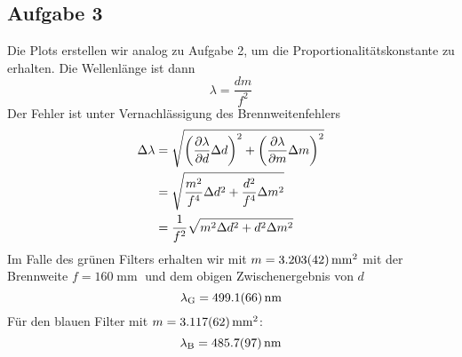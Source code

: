 \documentclass[a4paper,german,12pt,smallheadings]{scrartcl}
\begin{document}
\subsection{Aufgabe 3}
Die Plots erstellen wir analog zu Aufgabe 2, um die Proportionalitätskonstante
zu erhalten. Die Wellenlänge ist dann
\begin{equation}
\lambda = \frac{dm}{f^2}
\end{equation}
Der Fehler ist unter Vernachlässigung des Brennweitenfehlers
\begin{align*}
\Delta \lambda &= \sqrt{
\del{\frac{\partial \lambda}{\partial d} \Delta d}^2 +
\del{\frac{\partial \lambda}{\partial m} \Delta m}^2
} \\
&= \sqrt{
\frac{m^2}{f^4} \Delta d^2 +
\frac{d^2}{f^4} \Delta m^2
} \\
&= \frac{1}{f^2} \sqrt{
m^2 \Delta d^2 +
d^2 \Delta m^2
}
\end{align*}
Im Falle des grünen Filters erhalten wir mit $m = \num{3.203+-0.042}
\operatorname{mm}^2$ mit der Brennweite $f = 160 \operatorname{mm}$ und
dem obigen Zwischenergebnis von $d$
\begin{equation}
\lambda_\text{G} = \num{499.1+-6.6} \operatorname{nm}
\end{equation}
Für den blauen Filter mit $m = \num{3.117 \pm 0.062} \operatorname{mm}^2$:
\begin{equation}
\lambda_\text{B} = \num{485.7+-9.7} \operatorname{nm}
\end{equation}
\end{document}

